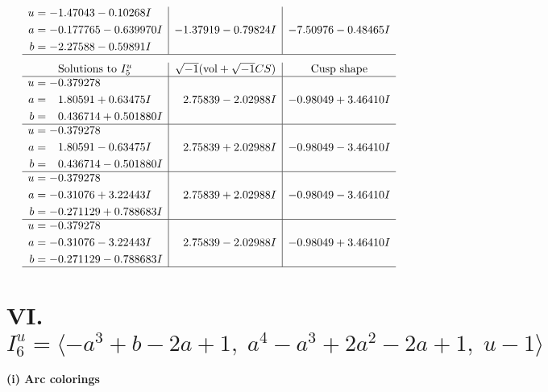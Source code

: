 \documentclass[1p]{elsarticle_modified}
\theoremstyle{definition}
\newcommand{\I}{\sqrt{-1}}
\begin{document}
$$\begin{array}{c|c|c}
\begin{aligned}
u &= -1.47043 - 0.10268 I \\
a &= -0.177765 - 0.639970 I \\
b &= -2.27588 - 0.59891 I\end{aligned}
 & -1.37919 - 0.79824 I & -7.50976 - 0.48465 I\\
 \hline 
 \end{array}$$\newpage$$\begin{array}{c|c|c}  
\text{Solutions to }I^u_{5}& \I (\text{vol} + \sqrt{-1}CS) & \text{Cusp shape}\\
 \hline 
\begin{aligned}
u &= -0.379278\phantom{ +0.000000I} \\
a &= \phantom{-}1.80591 + 0.63475 I \\
b &= \phantom{-}0.436714 + 0.501880 I\end{aligned}
 & \phantom{-}2.75839 - 2.02988 I & -0.98049 + 3.46410 I \\ \hline\begin{aligned}
u &= -0.379278\phantom{ +0.000000I} \\
a &= \phantom{-}1.80591 - 0.63475 I \\
b &= \phantom{-}0.436714 - 0.501880 I\end{aligned}
 & \phantom{-}2.75839 + 2.02988 I & -0.98049 - 3.46410 I \\ \hline\begin{aligned}
u &= -0.379278\phantom{ +0.000000I} \\
a &= -0.31076 + 3.22443 I \\
b &= -0.271129 + 0.788683 I\end{aligned}
 & \phantom{-}2.75839 + 2.02988 I & -0.98049 - 3.46410 I \\ \hline\begin{aligned}
u &= -0.379278\phantom{ +0.000000I} \\
a &= -0.31076 - 3.22443 I \\
b &= -0.271129 - 0.788683 I\end{aligned}
 & \phantom{-}2.75839 - 2.02988 I & -0.98049 + 3.46410 I\\
 \hline 
 \end{array}$$\newpage\newpage\renewcommand{\arraystretch}{1}
\centering \section*{VI. $I^u_{6}= \langle - a^3+b-2 a+1,\;a^4- a^3+2 a^2-2 a+1,\;u-1 \rangle$}
\flushleft \textbf{(i) Arc colorings}\\
\end{document}
